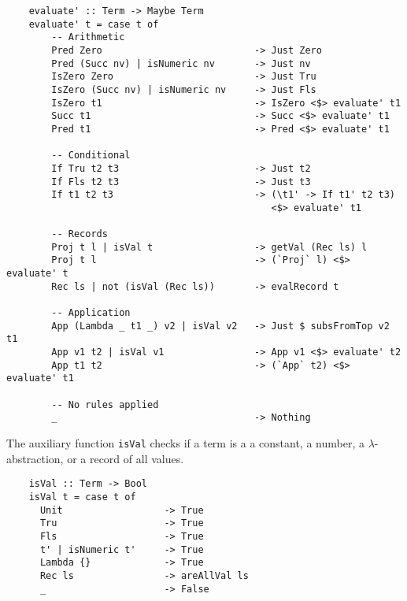 \documentclass[fleqn, 11pt]{article}
\begin{document}
\begin{Verbatim}
    evaluate' :: Term -> Maybe Term
    evaluate' t = case t of
        -- Arithmetic
        Pred Zero                           -> Just Zero                               
        Pred (Succ nv) | isNumeric nv       -> Just nv                                  
        IsZero Zero                         -> Just Tru                                 
        IsZero (Succ nv) | isNumeric nv     -> Just Fls                                 
        IsZero t1                           -> IsZero <$> evaluate' t1                  
        Succ t1                             -> Succ <$> evaluate' t1                    
        Pred t1                             -> Pred <$> evaluate' t1                    

        -- Conditional
        If Tru t2 t3                        -> Just t2                                  
        If Fls t2 t3                        -> Just t3                                  
        If t1 t2 t3                         -> (\t1' -> If t1' t2 t3) 
                                               <$> evaluate' t1  

        -- Records
        Proj t l | isVal t                  -> getVal (Rec ls) l                        
        Proj t l                            -> (`Proj` l) <$> evaluate' t       
        Rec ls | not (isVal (Rec ls))       -> evalRecord t 

        -- Application
        App (Lambda _ t1 _) v2 | isVal v2   -> Just $ subsFromTop v2 t1                 
        App v1 t2 | isVal v1                -> App v1 <$> evaluate' t2                  
        App t1 t2                           -> (`App` t2) <$> evaluate' t1                                         
                        
        -- No rules applied
        _                                   -> Nothing  
\end{Verbatim}

The auxiliary function \texttt{isVal} checks if a term is a a constant, a number, a $\lambda$-abstraction, or a record of all values.

\begin{Verbatim}
    isVal :: Term -> Bool
    isVal t = case t of 
      Unit                  -> True
      Tru                   -> True
      Fls                   -> True
      t' | isNumeric t'     -> True
      Lambda {}             -> True
      Rec ls                -> areAllVal ls
      _                     -> False
\end{Verbatim}
\end{document}
